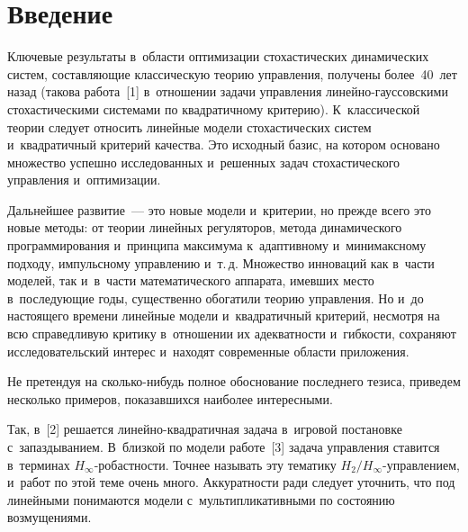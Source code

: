 
  



\thispagestyle{headings}

\begin{multicols}{2}

\label{st\stat}

\section{Введение}

     Ключевые результаты в~области оптимизации стохастических 
динамических систем, со\-став\-ля\-ющие классическую теорию управления, 
получены более~40~лет назад (такова работа~[1] в~отношении задачи 
управ\-ле\-ния ли\-ней\-но-гаус\-сов\-ски\-ми стохастическими сис\-те\-ма\-ми по 
квад\-ра\-тич\-но\-му критерию). К~классической тео\-рии следует относить 
линейные модели стохастических сис\-тем и~квадратичный критерий качества. 
Это исходный базис, на котором основано множество успешно 
исследованных и~решенных задач стохастического управ\-ле\-ния 
и~оптимизации. 

Дальнейшее развитие~--- это новые модели и~критерии, но 
прежде всего это новые методы: от тео\-рии линейных регуляторов, метода 
динамического программирования и~принципа максимума к~адаптивному 
и~минимаксному подходу, импульсному управ\-ле\-нию и~т.\,д. Множество 
инноваций как в~час\-ти моделей, так и~в~час\-ти математического аппарата, 
имевших мес\-то в~по\-сле\-ду\-ющие годы, существенно обогатили тео\-рию 
управ\-ле\-ния. Но и~до настоящего времени линейные модели и~квадратичный 
критерий, несмотря на всю справедливую критику в~отношении их 
аде\-кват\-ности и~гиб\-кости, сохраняют исследовательский интерес и~находят 
современные области приложения.
     
     Не претендуя на сколь\-ко-ни\-будь полное обосно\-ва\-ние последнего 
тезиса, приведем несколько примеров, показавшихся наиболее ин\-те\-рес\-ными. 

Так, в~[2] решается ли\-ней\-но-квад\-ра\-тич\-ная за\-да\-ча в~игровой 
постановке с~запаздыванием. В~близ\-кой по модели работе~[3] задача 
управ\-ле\-ния ставится в~терминах $H_\infty$-ро\-баст\-ности. Точнее \mbox{называть} 
эту тематику $H_2/H_\infty$-управ\-ле\-ни\-ем, и~работ по этой теме очень 
много. Аккуратности ради следует уточнить, что под линейными 
понимаются модели с~мультипликативными по состоянию воз\-му\-ще\-ниями. 


\end{multicols}
